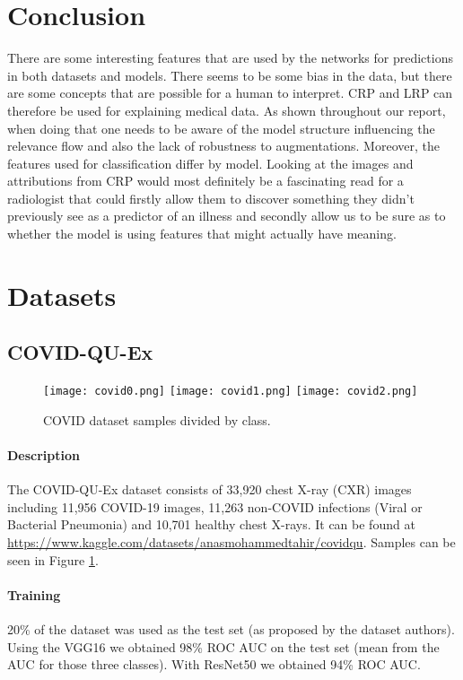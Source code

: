 \documentclass[twoside,11pt]{article}
\begin{document}
\section{Conclusion}
There are some interesting features that are used by the networks for predictions in both datasets and models. There seems to be some bias in the data, but there are some concepts that are possible for a human to interpret. CRP and LRP can therefore be used for explaining medical data. As shown throughout our report, when doing that one needs to be aware of the model structure influencing the relevance flow and also the lack of robustness to augmentations. Moreover, the features used for classification differ by model. Looking at the images and attributions from CRP would most definitely be a fascinating read for a radiologist that could firstly allow them to discover something they didn't previously see as a predictor of an illness and secondly allow us to be sure as to whether the model is using features that might actually have meaning.


\clearpage



\clearpage
\appendix
\section{Datasets} \label{appendix:datasets}
\subsection{COVID-QU-Ex}
\begin{figure}[t]
    \centering
    \texttt{[image: covid0.png]}
    \texttt{[image: covid1.png]}
    \texttt{[image: covid2.png]}
    \caption{COVID dataset samples divided by class.}
    \label{fig:covid_dataset}
\end{figure}
\paragraph{Description}
The COVID-QU-Ex dataset \citep{covid} consists of 33,920 chest X-ray (CXR) images including
11,956 COVID-19 images,
11,263 non-COVID infections (Viral or Bacterial Pneumonia) and
10,701 healthy chest X-rays.
It can be found at \url{https://www.kaggle.com/datasets/anasmohammedtahir/covidqu}.
Samples can be seen in Figure \ref{fig:covid_dataset}.
\paragraph{Training}
20\% of the dataset was used as the test set (as proposed by the dataset authors).
Using the VGG16 we obtained 98\% ROC AUC on the test set (mean from the AUC for those three classes).
With ResNet50 we obtained 94\% ROC AUC.
\end{document}
